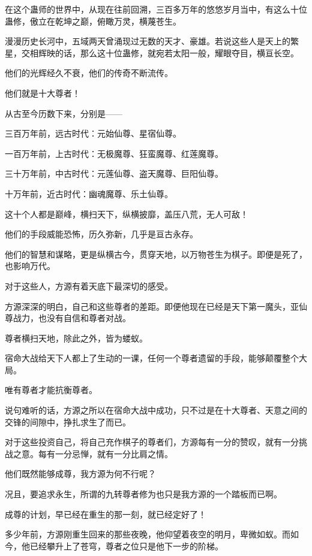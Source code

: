 
\begin{this_body}

在这个蛊师的世界中，从现在往前回溯，三百多万年的悠悠岁月当中，有这么十位蛊修，傲立在乾坤之巅，俯瞰万灵，横蔑苍生。

漫漫历史长河中，五域两天曾涌现过无数的天才、豪雄。若说这些人是天上的繁星，交相辉映的话，那么这十位蛊修，就宛若太阳一般，耀眼夺目，横亘长空。

他们的光辉经久不衰，他们的传奇不断流传。

他们就是十大尊者！

从古至今历数下来，分别是——

三百万年前，远古时代：元始仙尊、星宿仙尊。

一百万年前，上古时代：无极魔尊、狂蛮魔尊、红莲魔尊。

三十万年前，中古时代：元莲仙尊、盗天魔尊、巨阳仙尊。

十万年前，近古时代：幽魂魔尊、乐土仙尊。

这十个人都是巅峰，横扫天下，纵横披靡，盖压八荒，无人可敌！

他们的手段威能恐怖，历久弥新，几乎是亘古永存。

他们的智慧和谋略，更是纵横古今，贯穿天地，以万物苍生为棋子。即便是死了，也影响万代。

对于这些人，方源有着天底下最深切的感受。

方源深深的明白，自己和这些尊者的差距。即便他现在已经是天下第一魔头，亚仙尊战力，也没有自信和尊者对战。

尊者横扫天地，除此之外，皆为蝼蚁。

宿命大战给天下人都上了生动的一课，任何一个尊者遗留的手段，能够颠覆整个大局。

唯有尊者才能抗衡尊者。

说句难听的话，方源之所以在宿命大战中成功，只不过是在十大尊者、天意之间的交锋的间隙中，挣扎求生了而已。

对于这些投资自己，将自己充作棋子的尊者们，方源每有一分的赞叹，就有一分挑战之意。每有一分忌惮，就有一分比肩之情。

他们既然能够成尊，我方源为何不行呢？

况且，要追求永生，所谓的九转尊者修为也只是我方源的一个踏板而已啊。

成尊的计划，早已经在重生的那一刻，就已经定好了！

多少年前，方源刚重生回来的那些夜晚，他仰望着夜空的明月，卑微如蚁。而如今，他已经攀升上了苍穹，尊者之位只是他下一步的阶梯。


\end{this_body}
